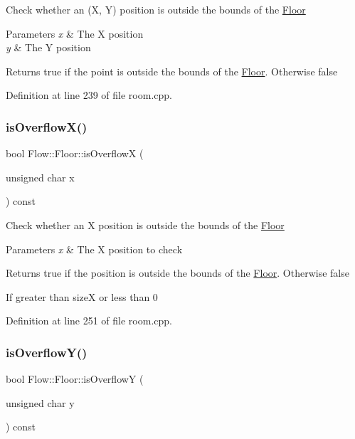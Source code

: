 Check whether an (X, Y) position is outside the bounds of the \hyperlink{class_flow_1_1_floor}{Floor} 
\begin{DoxyParams}{Parameters}
{\em x} & The X position \\
\hline
{\em y} & The Y position \\
\hline
\end{DoxyParams}
\begin{DoxyReturn}{Returns}
true if the point is outside the bounds of the \hyperlink{class_flow_1_1_floor}{Floor}. Otherwise false 
\end{DoxyReturn}


Definition at line 239 of file room.\+cpp.

\hypertarget{class_flow_1_1_floor_a6511d441ffd99d0a0d85669cfa846945}{}\label{class_flow_1_1_floor_a6511d441ffd99d0a0d85669cfa846945} 
\subsubsection{\texorpdfstring{is\+Overflow\+X()}{isOverflowX()}}
{\footnotesize\ttfamily bool Flow\+::\+Floor\+::is\+OverflowX (\begin{DoxyParamCaption}\item[{unsigned char}]{x }\end{DoxyParamCaption}) const}

Check whether an X position is outside the bounds of the \hyperlink{class_flow_1_1_floor}{Floor} 
\begin{DoxyParams}{Parameters}
{\em x} & The X position to check \\
\hline
\end{DoxyParams}
\begin{DoxyReturn}{Returns}
true if the position is outside the bounds of the \hyperlink{class_flow_1_1_floor}{Floor}. Otherwise false 
\end{DoxyReturn}
If greater than sizeX or less than 0 

Definition at line 251 of file room.\+cpp.

\hypertarget{class_flow_1_1_floor_aae39e73db09b3b26d17dfda7418a67d1}{}\label{class_flow_1_1_floor_aae39e73db09b3b26d17dfda7418a67d1} 
\subsubsection{\texorpdfstring{is\+Overflow\+Y()}{isOverflowY()}}
{\footnotesize\ttfamily bool Flow\+::\+Floor\+::is\+OverflowY (\begin{DoxyParamCaption}\item[{unsigned char}]{y }\end{DoxyParamCaption}) const}

